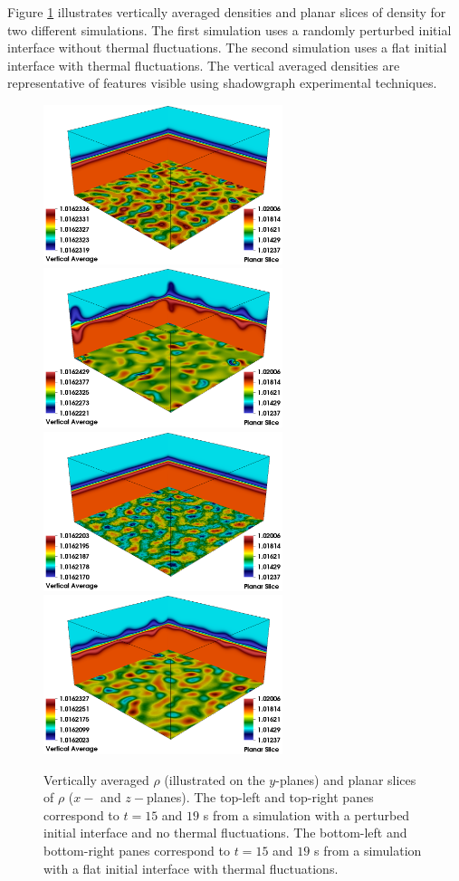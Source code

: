 \documentclass[final]{siamltex}
\begin{document}
Figure \ref{fig:dlc_images} illustrates vertically averaged densities and planar slices
of density for two different simulations.  The first simulation uses a randomly perturbed
initial interface without thermal fluctuations.  The second simulation uses a flat initial
interface with thermal fluctuations.  The vertical averaged densities are representative
of features visible using shadowgraph experimental techniques.
\begin{figure}[hb]
\centering
\includegraphics[width=2.75in]{DLC_pert_t15}
\includegraphics[width=2.75in]{DLC_pert_t19}\\
\includegraphics[width=2.75in]{DLC_therm_t15}
\includegraphics[width=2.75in]{DLC_therm_t19}
\label{fig:dlc_images}
\caption{Vertically averaged $\rho$ (illustrated on the $y$-planes) and planar
slices of $\rho$ ($x-$ and $z-$planes).  The top-left and top-right panes correspond
to $t=15$ and $19$ s from a simulation with a perturbed initial interface and no thermal
fluctuations.  The bottom-left and bottom-right panes correspond to $t=15$ and $19$ s
from a simulation with a flat initial interface with thermal fluctuations.}
\end{figure}
\end{document}
